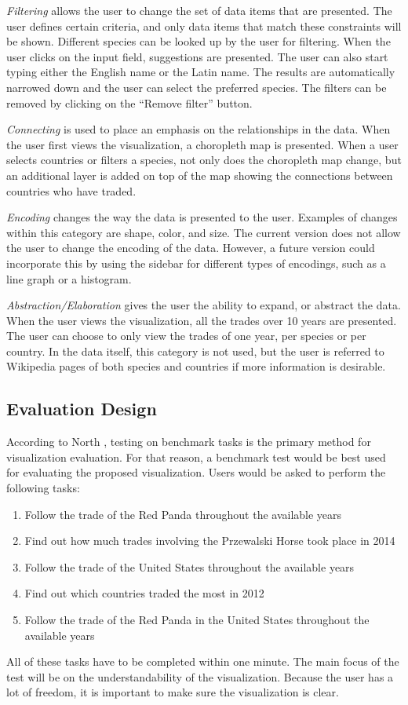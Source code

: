 \textit{Filtering} allows the user to change the set of data items that are presented. The user defines certain criteria, and only data items that match these constraints will be shown. Different species can be looked up by the user for filtering. When the user clicks on the input field, suggestions are presented. The user can also start typing either the English name or the Latin name. The results are automatically narrowed down and the user can select the preferred species. The filters can be removed by clicking on the ``Remove filter'' button.

\textit{Connecting} is used to place an emphasis on the relationships in the data. When the user first views the visualization, a choropleth map is presented. When a user selects countries or filters a species, not only does the choropleth map change, but an additional layer is added on top of the map showing the connections between countries who have traded.

\textit{Encoding} changes the way the data is presented to the user. Examples of changes within this category are shape, color, and size. The current version does not allow the user to change the encoding of the data. However, a future version could incorporate this by using the sidebar for different types of encodings, such as a line graph or a histogram. 

\textit{Abstraction/Elaboration} gives the user the ability to expand, or abstract the data. When the user views the visualization, all the trades over 10 years are presented. The user can choose to only view the trades of one year, per species or per country. In the data itself, this category is not used, but the user is referred to Wikipedia pages of both species and countries if more information is desirable. 

\subsection{Evaluation Design}
According to North \cite{North2006}, testing on benchmark tasks is the primary method for visualization evaluation. For that reason, a benchmark test would be best used for evaluating the proposed visualization. Users would be asked to perform the following tasks: 
\begin{enumerate}
\item Follow the trade of the Red Panda throughout the available years
\item Find out how much trades involving the Przewalski Horse took place in 2014
\item Follow the trade of the United States throughout the available years
\item Find out which countries traded the most in 2012
\item Follow the trade of the Red Panda in the United States throughout the available years
\end{enumerate}
All of these tasks have to be completed within one minute. The main focus of the test will be on the understandability of the visualization. Because the user has a lot of freedom, it is important to make sure the visualization is clear.

